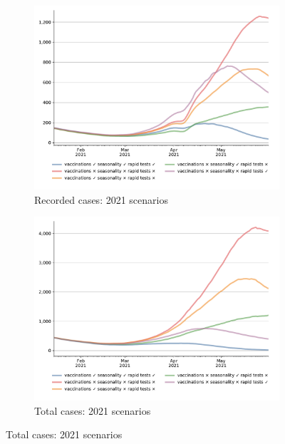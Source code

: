 \begin{figure}[!tp]
    \centering

    \begin{subfigure}[b]{0.475\textwidth}
        \centering
        \includegraphics[width=\textwidth]{../figures/results/figures/scenario_comparisons/effect_of_channels_on_pessimistic_scenario/full_new_known_case}
        \caption{{Recorded cases: 2021 scenarios}}
        \label{fig:2021_scenarios_recorded}
    \end{subfigure}
    \hfill
    \begin{subfigure}[b]{0.475\textwidth}
        \centering
        \includegraphics[width=\textwidth]{../figures/results/figures/scenario_comparisons/effect_of_channels_on_pessimistic_scenario/full_newly_infected}
        \caption{{Total cases: 2021 scenarios}}
        \label{fig:2021_scenarios_newly_infected}
    \end{subfigure}


\end{figure}
